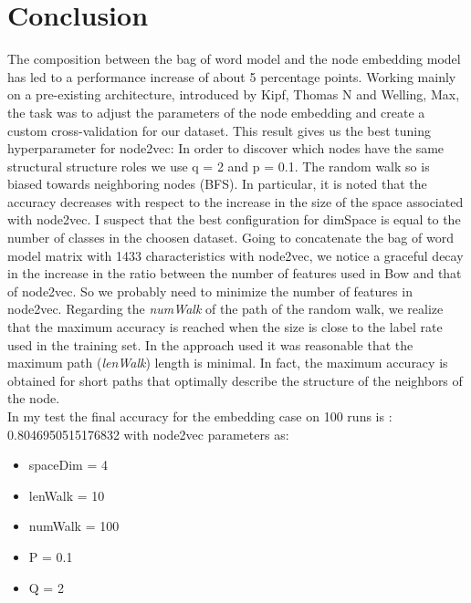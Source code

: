 \documentclass{report}
\begin{document}
\section{Conclusion}
The composition between the bag of word model and the node embedding model has led to a performance increase of about 5 percentage points.
Working mainly on a pre-existing architecture, introduced by Kipf, Thomas N and Welling, Max, the task was to adjust the parameters of the node embedding and create a custom cross-validation for our dataset.
This result gives us the best tuning hyperparameter for node2vec: In order to discover which nodes have the same structural structure roles we use q = 2 and p = 0.1. The random walk so is biased towards neighboring nodes (BFS).
In particular, it is noted that the accuracy decreases with respect to the increase in the size of the space associated with node2vec. I suspect that the best configuration for dimSpace is equal to the number of classes in the choosen dataset. 
Going to concatenate the bag of word model matrix with 1433 characteristics with node2vec, we notice a graceful decay in the increase in the ratio between the number of features used in Bow and that of node2vec. So we probably need to minimize the number of features in node2vec.
Regarding the \textit{numWalk} of the path of the random walk, we realize that the maximum accuracy is reached when the size is close to the label rate used in the training set.
In the approach used it was reasonable that the maximum path (\textit{lenWalk}) length is minimal. In fact, the maximum accuracy is obtained for short paths that optimally describe the structure of the neighbors of the node.\\

In my test the final accuracy for the embedding case on 100 runs is : 0.8046950515176832 with node2vec parameters as:
\begin{itemize}
\item spaceDim = 4
\item lenWalk = 10
\item numWalk = 100
\item P = 0.1
\item Q = 2
\end{itemize}
\end{document}
